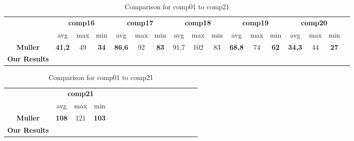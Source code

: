 \begin{table}[h!]
\centering
\footnotesize
\begin{tabular}{ccccccccccccccccc}
\hline
& \multicolumn{3}{c}{\textbf{comp16}} & \multicolumn{3}{c}{\textbf{comp17}} & \multicolumn{3}{c}{\textbf{comp18}} & \multicolumn{3}{c}{\textbf{comp19}} & \multicolumn{3}{c}{\textbf{comp20}} \\
& avg & max & min & avg & max & min & avg & max & min & avg & max & min & avg & max & min \\
\textbf{Muller} & \textbf{41,2} & 49 & \textbf{34} & \textbf{86,6} & 92 & \textbf{83} & 91,7 & 102 & 83 & \textbf{68,8} & 74 & \textbf{62} & \textbf{34,3} & 44 & \textbf{27}  \\
\textbf{Our Results} & & & & & & & & & & & & & & & \\
\end{tabular}

\centering
\footnotesize
\begin{tabular}{ccccccccccccccccc}
\hline
& \multicolumn{3}{c}{\textbf{comp21}} & \multicolumn{3}{c}{} &  \multicolumn{3}{c}{} & \multicolumn{3}{c}{} & \multicolumn{3}{c}{} \\
& avg & max & min &  &  &  &  &  &  &  &  &  &  &  &  \\
\textbf{Muller} & \textbf{108} & 121 & \textbf{103}  \\
\textbf{Our Results} & & &  \\
\hline
\end{tabular}
\caption{Comparison for comp01 to comp21}
\end{table}
